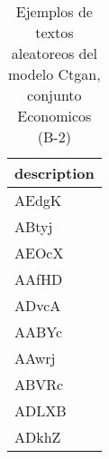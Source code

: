 \begin{table}[H]
\centering
\fontsize{8}{14}\selectfont
\caption{Ejemplos de textos aleatoreos del modelo Ctgan, conjunto Economicos (B-2)}
\label{table-sample10-economicos-b-2-ctgan-text}
\begin{tabular}{|m{50em}|}
\hline
\rowcolor[gray]{0.8}
description \\
\hline AEdgK \\
\hline ABtyj \\
\hline AEOcX \\
\hline AAfHD \\
\hline ADvcA \\
\hline AABYc \\
\hline AAwrj \\
\hline ABVRc \\
\hline ADLXB \\
\hline ADkhZ \\
\hline
\end{tabular}
\end{table}
